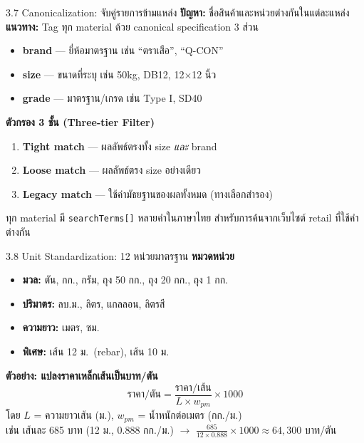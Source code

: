 \documentclass[aspectratio=169,11pt]{beamer}
\begin{document}
\begin{frame}{3.7 Canonicalization: จับคู่รายการข้ามแหล่ง}
  \textbf{ปัญหา:} ชื่อสินค้าและหน่วยต่างกันในแต่ละแหล่ง \\
  \textbf{แนวทาง:} Tag ทุก material ด้วย canonical specification 3 ส่วน
  \begin{itemize}
    \item \textbf{brand} --- ยี่ห้อมาตรฐาน เช่น ``ตราเสือ'', ``Q-CON''
    \item \textbf{size} --- ขนาดที่ระบุ เช่น 50kg, DB12, 12$\times$12 นิ้ว
    \item \textbf{grade} --- มาตรฐาน/เกรด เช่น Type I, SD40
  \end{itemize}
  \vspace{0.3em}
  \textbf{ตัวกรอง 3 ชั้น (Three-tier Filter)}
  \begin{enumerate}
    \item \textbf{Tight match} --- ผลลัพธ์ตรงทั้ง size \emph{และ} brand
    \item \textbf{Loose match} --- ผลลัพธ์ตรง size อย่างเดียว
    \item \textbf{Legacy match} --- ใช้ค่ามัธยฐานของผลทั้งหมด (ทางเลือกสำรอง)
  \end{enumerate}
  \vspace{0.3em}
  \footnotesize
  ทุก material มี \texttt{searchTerms[]} หลายคำในภาษาไทย
  สำหรับการค้นจากเว็บไซต์ retail ที่ใช้คำต่างกัน
\end{frame}

\begin{frame}{3.8 Unit Standardization: 12 หน่วยมาตรฐาน}
  \textbf{หมวดหน่วย}
  \begin{itemize}
    \item \textbf{มวล:} ตัน, กก., กรัม, ถุง 50 กก., ถุง 20 กก., ถุง 1 กก.
    \item \textbf{ปริมาตร:} ลบ.ม., ลิตร, แกลลอน, ลิตรสี
    \item \textbf{ความยาว:} เมตร, ซม.
    \item \textbf{พิเศษ:} เส้น 12 ม.\ (rebar), เส้น 10 ม.
  \end{itemize}
  \vspace{0.3em}
  \begin{exampleblock}{\textbf{ตัวอย่าง: แปลงราคาเหล็กเส้นเป็นบาท/ตัน}}
    \[
      \text{ราคา/ตัน} = \frac{\text{ราคา/เส้น}}{L \times w_{pm}} \times 1000
    \]
    โดย $L$ = ความยาวเส้น (ม.), $w_{pm}$ = น้ำหนักต่อเมตร (กก./ม.) \\
    เช่น เส้นละ 685 บาท (12 ม., 0.888 กก./ม.) $\to$
    $\frac{685}{12 \times 0.888} \times 1000 \approx 64{,}300$ บาท/ตัน
  \end{exampleblock}
\end{frame}
\end{document}
